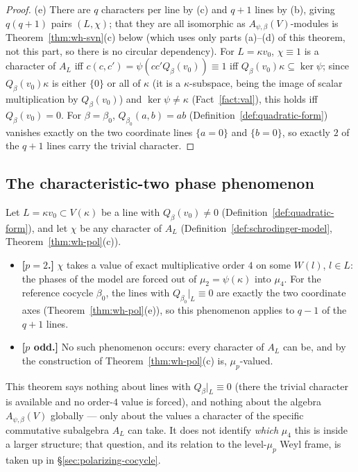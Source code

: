 \begin{proof}
(e) There are $q$ characters per line by (c) and $q+1$ lines by (b), giving
$q(q+1)$ pairs $(L,\chi)$; that they are all isomorphic as
$A_{\psi,\beta}(V)$-modules is Theorem~\ref{thm:wh-svn}(c) below (which uses
only parts (a)--(d) of this theorem, not this part, so there is no circular
dependency). For $L=\kappa v_0$, $\chi\equiv 1$ is a character of $A_L$ iff
$c(c,c')=\psi(cc'Q_\beta(v_0))\equiv 1$ iff $Q_\beta(v_0)\kappa\subseteq\ker\psi$;
since $Q_\beta(v_0)\kappa$ is either $\{0\}$ or all of $\kappa$ (it is a
$\kappa$-subspace, being the image of scalar multiplication by
$Q_\beta(v_0)$) and $\ker\psi\neq\kappa$ (Fact~\ref{fact:val}), this holds
iff $Q_\beta(v_0)=0$. For $\beta=\beta_0$, $Q_{\beta_0}(a,b)=ab$
(Definition~\ref{def:quadratic-form}) vanishes exactly on the two coordinate
lines $\{a=0\}$ and $\{b=0\}$, so exactly $2$ of the $q+1$ lines carry the
trivial character.
\end{proof}

\subsection{The characteristic-two phase phenomenon}

\statusProvedConditional
\begin{theorem}
\label{thm:wh-pol-2}
Let $L=\kappa v_0\subset V(\kappa)$ be a line with $Q_\beta(v_0)\neq 0$
(Definition~\ref{def:quadratic-form}), and let $\chi$ be any character of
$A_L$ (Definition~\ref{def:schrodinger-model}, Theorem~\ref{thm:wh-pol}(c)).
\begin{itemize}
\item \textbf{[$p=2$.]} $\chi$ takes a value of exact multiplicative order
$4$ on some $W(l)$, $l\in L$: the phases of the model are forced out of
$\mu_2=\psi(\kappa)$ into $\mu_4$. For the reference cocycle $\beta_0$, the
lines with $Q_{\beta_0}|_L\equiv 0$ are exactly the two coordinate axes
(Theorem~\ref{thm:wh-pol}(e)), so this phenomenon applies to $q-1$ of the
$q+1$ lines.
\item \textbf{[$p$ odd.]} No such phenomenon occurs: every character of
$A_L$ can be, and by the construction of Theorem~\ref{thm:wh-pol}(c) is,
$\mu_p$-valued.
\end{itemize}
\end{theorem}

\begin{scope}
This theorem says nothing about lines with $Q_\beta|_L\equiv 0$ (there the
trivial character is available and no order-$4$ value is forced), and
nothing about the algebra $A_{\psi,\beta}(V)$ globally — only about the
values a character of the specific commutative subalgebra $A_L$ can take.
It does not identify \emph{which} $\mu_4$ this is inside a larger structure;
that question, and its relation to the level-$\mu_p$ Weyl frame, is taken up
in \S\ref{sec:polarizing-cocycle}.
\end{scope}

